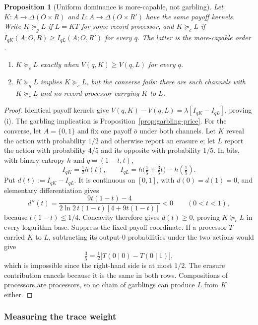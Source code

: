 \documentclass[11pt,a4paper]{article}
\newtheorem{proposition}[theorem]{Proposition}
\theoremstyle{definition}
\newcommand{\D}{\Delta}
\newcommand{\1}{\mathbf 1}
\begin{document}
\begin{samepage}
\begin{proposition}[Uniform dominance is more-capable, not garbling]
\label{prop:blackwell}\label{def:channel-orders}
Let $K:A\to\D(O\times R)$ and $L:A\to\D(O\times R')$ have the same
payoff kernels.  Write $K\succeq_gL$ if $L=KT$ for some record processor,
and $K\succeq_cL$ if $I_{qK}(A;O,R)\ge I_{qL}(A;O,R')$ for every $q$.
The latter is the \emph{more-capable} order \cite{KornerMarton1977}.
\begin{enumerate}[label=\textup{(\roman*)},leftmargin=*]
\item $K\succeq_cL$ exactly when $V(q,K)\ge V(q,L)$ for every $q$.
\item $K\succeq_gL$ implies $K\succeq_cL$, but the converse fails:
there are such channels with $K\succeq_cL$ and no record processor
carrying $K$ to $L$.
\end{enumerate}
\end{proposition}
\end{samepage}

\begin{proof}
Identical payoff kernels give
$V(q,K)-V(q,L)=\lambda[I_{qK}-I_{qL}]$, proving \textup{(i)}.
The garbling implication is Proposition~\ref{prop:garbling-price}.
For the converse, let $A=\{0,1\}$ and fix one payoff $\bar o$ under
both channels.  Let $K$ reveal the action with probability $1/2$ and
otherwise report an erasure $\mathrm e$; let $L$ report the action with
probability $4/5$ and its opposite with probability $1/5$.
In bits, with binary entropy $h$ and $q=(1-t,t)$,
\[
I_{qK}=\tfrac12h(t),\qquad
I_{qL}=h\bigl(\tfrac15+\tfrac35t\bigr)-h(\tfrac15).
\]
Put $d(t):=I_{qK}-I_{qL}$.  It is continuous on $[0,1]$, with
$d(0)=d(1)=0$, and elementary differentiation gives
\[
d''(t)=\frac{9t(1-t)-4}
 {2\ln2\,t(1-t)[4+9t(1-t)]}<0\qquad(0<t<1),
\]
because $t(1-t)\le1/4$.  Concavity therefore gives $d(t)\ge0$,
proving $K\succeq_cL$ in every logarithm base.
Suppress the fixed payoff coordinate.  If a processor $T$ carried $K$ to
$L$, subtracting its output-$0$
probabilities under the two actions would give
\[
\tfrac35=\tfrac12\bigl[T(0\mid0)-T(0\mid1)\bigr],
\]
which is impossible since the right-hand side is at most $1/2$.
The erasure contribution cancels because it is the same in both rows.
Compositions of processors are processors, so no chain of garblings
can produce $L$ from $K$ either.
\end{proof}

\subsubsection{Measuring the trace weight}
\label{app:measurement-proofs}
\end{document}
